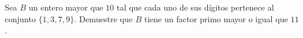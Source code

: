 Sea $B$ un entero mayor que $10$ tal que cada uno de sus dígitos pertenece al conjunto $\{1,3,7,9\}$. Demuestre que $B$ tiene un factor primo mayor o igual que $11$.
